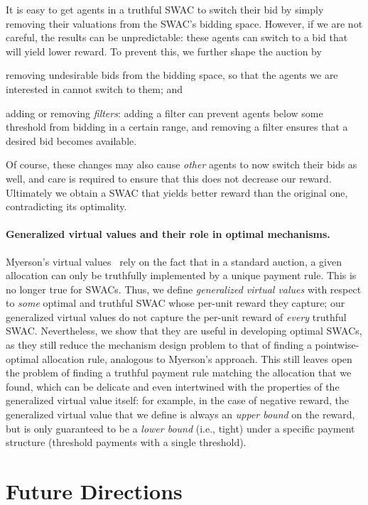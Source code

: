 \documentclass[11pt,letterpaper]{article}
\newcommand{\swac}{SWAC\xspace}
\newcommand{\swacs}{SWACs\xspace}
\theoremstyle{plain}
\begin{document}
It is easy to get agents in a truthful \swac to switch their bid by simply removing their valuations from the \swac's bidding space.
However, if we are not careful,
the results can be unpredictable:
these agents can switch to a bid
that will yield lower reward.
To prevent this,
we further shape the auction by
\begin{enumerate*}
    \item removing undesirable bids from the bidding space, so that the agents we are interested in cannot switch to them; and
    \item adding or removing \emph{filters}:
    adding a filter can
prevent agents below some threshold from bidding in a certain range,
and removing a filter ensures that a desired bid becomes available.
\end{enumerate*}
Of course, these changes may also cause \emph{other} agents to now switch their bids as well,
and care is required to ensure that this does not decrease our reward.
 Ultimately we obtain a \swac that yields better reward than the original one, contradicting its optimality.

\paragraph{Generalized virtual values and their role in optimal mechanisms.}
Myerson's virtual values~\cite{myerson1981optimal} rely on  the fact that in a standard auction,
a given allocation can only be truthfully implemented by a unique payment rule.
This is no longer true for \swacs.
Thus, we define \emph{generalized virtual values} with respect to \emph{some} optimal and truthful \swac whose per-unit reward they capture;
our generalized virtual values do not capture the per-unit reward of \emph{every} truthful \swac.
Nevertheless, we show that they are useful in developing optimal \swacs,
as they still reduce the mechanism design problem to 
that of finding a pointwise-optimal allocation rule,
analogous to Myerson's approach.
This still leaves open the problem of finding a truthful payment rule matching the allocation that we  found,
which can be delicate
and even intertwined with the properties of the generalized virtual value itself:
for example, in the case of negative reward,
the generalized virtual value that we define
is always an \emph{upper bound} on the reward,
but is only guaranteed to be a \emph{lower bound} (i.e., tight)
under a specific payment structure (threshold payments with a single threshold). 

\section{Future Directions}\label{sec:future}
\end{document}
